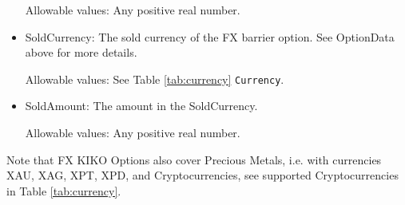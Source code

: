 \begin{itemize}
Allowable values:  Any positive real number.

\item SoldCurrency: The sold currency of the FX barrier option. See OptionData above for more details.

Allowable values:  See Table \ref{tab:currency} \lstinline!Currency!.

\item SoldAmount: The amount in the SoldCurrency.  

Allowable values:  Any positive real number.

\end{itemize}

Note that FX KIKO Options also cover Precious Metals, i.e. with
currencies XAU, XAG, XPT, XPD, and Cryptocurrencies,  see supported Cryptocurrencies in Table \ref{tab:currency}.
